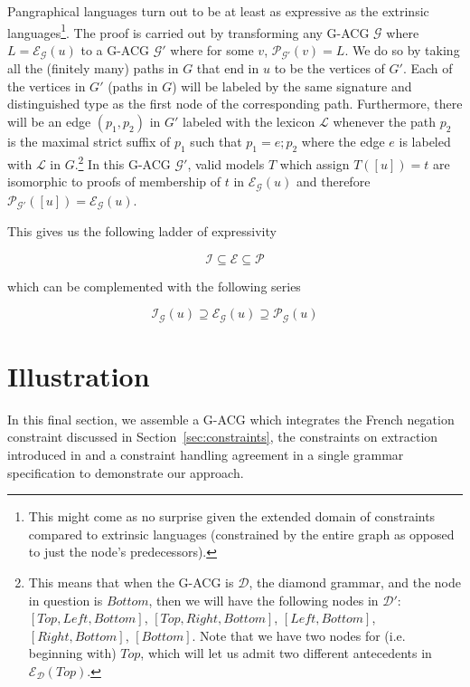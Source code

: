 \documentclass{llncs}
\begin{document}
Pangraphical languages turn out to be at least as expressive as the extrinsic
languages\footnote{This might come as no surprise given the extended domain of
  constraints compared to extrinsic languages (constrained by the entire graph
  as opposed to just the node's predecessors).}. The proof is carried out by
transforming any G-ACG $\mathcal{G}$ where $L = \mathcal{E}_{\mathcal{G}}(u)$
to a G-ACG $\mathcal{G'}$ where for some $v$, $\mathcal{P}_{\mathcal{G'}}(v) =
L$. We do so by taking all the (finitely many) paths in $G$ that end in $u$ to
be the vertices of $G'$. Each of the vertices in $G'$ (paths in $G$) will be
labeled by the same signature and distinguished type as the first node of the
corresponding path. Furthermore, there will be an edge $(p_1, p_2)$ in $G'$
labeled with the lexicon $\mathcal{L}$ whenever the path $p_2$ is the maximal
strict suffix of $p_1$ such that $p_1 = e; p_2$ where the edge $e$ is labeled
with $\mathcal{L}$ in $G$.\footnote{This means that when the G-ACG is
  $\mathcal{D}$, the diamond grammar, and the node in question is $Bottom$,
  then we will have the following nodes in $\mathcal{D}'$: $[Top, Left,
    Bottom]$, $[Top, Right, Bottom]$, $[Left, Bottom]$, $[Right, Bottom]$,
  $[Bottom]$. Note that we have two nodes for (i.e. beginning with) $Top$,
  which will let us admit two different antecedents in
  $\mathcal{E}_{\mathcal{D}}(Top)$.} In this G-ACG $\mathcal{G'}$, valid
models $T$ which assign $T([u]) = t$ are isomorphic to proofs of membership of
$t$ in $\mathcal{E}_{\mathcal{G}}(u)$ and therefore
$\mathcal{P}_{\mathcal{G'}}([u]) = \mathcal{E}_{\mathcal{G}}(u)$.

This gives us the following ladder of expressivity

$$
\mathcal{I} \subseteq \mathcal{E} \subseteq \mathcal{P}
$$

which can be complemented with the following series

$$
\mathcal{I}_{\mathcal{G}}(u) \supseteq \mathcal{E}_{\mathcal{G}}(u) \supseteq
\mathcal{P}_{\mathcal{G}}(u)
$$


\section{Illustration}

In this final section, we assemble a G-ACG which integrates the French
negation constraint discussed in Section~\ref{sec:constraints}, the
constraints on extraction introduced in \cite{pogodalla2012controlling} and a
constraint handling agreement in a single grammar specification to demonstrate
our approach.
\end{document}
